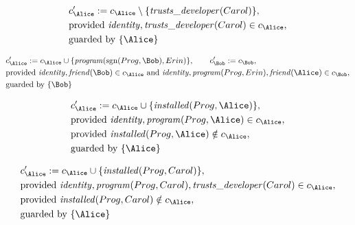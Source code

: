 \begin{align*}
&
c'_
{
\Alice
}
 := 
c_
{
\Alice
}
 \setminus 
\{
\mathit{\detokenize{
trusts_developer
}}
(
Carol
)
\}
,\\
&
\text{provided } 
\mathit{\detokenize{
identity
}}
,
\mathit{\detokenize{
trusts_developer
}}
(
Carol
)
 \in c_
{
\Alice
}
,\\
&
\text{guarded by } \{
\Alice
\}
\end{align*}

\begin{align*}
&
c'_
{
\Alice
}
 := 
c_
{
\Alice
}
 \cup 
\{
\mathit{\detokenize{
program
}}
(
\mathrm{sgn}(
Prog
,
\Bob
)
,
Erin
)
\}
, \qquad 
c'_
{
\Bob
}
 := 
c_
{
\Bob
}
,\\
&
\text{provided } 
\mathit{\detokenize{
identity
}}
,
\mathit{\detokenize{
friend
}}
(
\Bob
)
 \in c_
{
\Alice
}
 \text{ and } 
\mathit{\detokenize{
identity
}}
,
\mathit{\detokenize{
program
}}
(
Prog
,
Erin
)
,
\mathit{\detokenize{
friend
}}
(
\Alice
)
 \in c_
{
\Bob
}
,\\
&
\text{guarded by } \{
\Bob
\}
\end{align*}

\begin{align*}
&
c'_
{
\Alice
}
 := 
c_
{
\Alice
}
 \cup 
\{
\mathit{\detokenize{
installed
}}
(
Prog
,
\Alice
)
\}
,\\
&
\text{provided } 
\mathit{\detokenize{
identity
}}
,
\mathit{\detokenize{
program
}}
(
Prog
,
\Alice
)
 \in c_
{
\Alice
}
,\\
&
\text{provided } 
\mathit{\detokenize{
installed
}}
(
Prog
,
\Alice
)
 \notin c_
{
\Alice
}
,\\
&
\text{guarded by } \{
\Alice
\}
\end{align*}

\begin{align*}
&
c'_
{
\Alice
}
 := 
c_
{
\Alice
}
 \cup 
\{
\mathit{\detokenize{
installed
}}
(
Prog
,
Carol
)
\}
,\\
&
\text{provided } 
\mathit{\detokenize{
identity
}}
,
\mathit{\detokenize{
program
}}
(
Prog
,
Carol
)
,
\mathit{\detokenize{
trusts_developer
}}
(
Carol
)
 \in c_
{
\Alice
}
,\\
&
\text{provided } 
\mathit{\detokenize{
installed
}}
(
Prog
,
Carol
)
 \notin c_
{
\Alice
}
,\\
&
\text{guarded by } \{
\Alice
\}
\end{align*}

